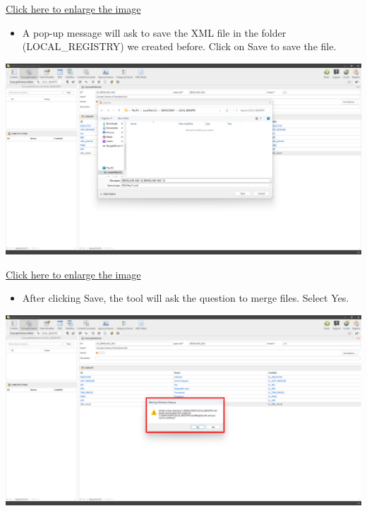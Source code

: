 \documentclass[
]{book}
\providecommand{\tightlist}{%
  \setlength{\itemsep}{0pt}\setlength{\parskip}{0pt}}
\begin{document}
\href{images/image118.png}{Click here to enlarge the image}

\begin{itemize}
\tightlist
\item
  A pop-up message will ask to save the XML file in the folder (LOCAL\_REGISTRY) we created before. Click on Save to save the file.
\end{itemize}

\begin{center}\includegraphics[width=1\linewidth]{./images/image123} \end{center}

\href{images/image123.png}{Click here to enlarge the image}

\begin{itemize}
\tightlist
\item
  After clicking Save, the tool will ask the question to merge files. Select Yes.
\end{itemize}

\begin{center}\includegraphics[width=1\linewidth]{./images/image125} \end{center}
\end{document}
